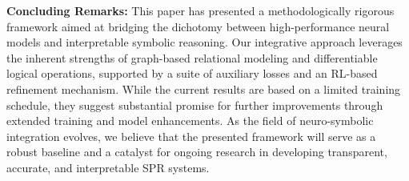\documentclass{article}
\begin{document}
\vspace{2ex}
\noindent\textbf{Concluding Remarks:} This paper has presented a methodologically rigorous framework aimed at bridging the dichotomy between high-performance neural models and interpretable symbolic reasoning. Our integrative approach leverages the inherent strengths of graph-based relational modeling and differentiable logical operations, supported by a suite of auxiliary losses and an RL-based refinement mechanism. While the current results are based on a limited training schedule, they suggest substantial promise for further improvements through extended training and model enhancements. As the field of neuro-symbolic integration evolves, we believe that the presented framework will serve as a robust baseline and a catalyst for ongoing research in developing transparent, accurate, and interpretable SPR systems.
\end{document}
